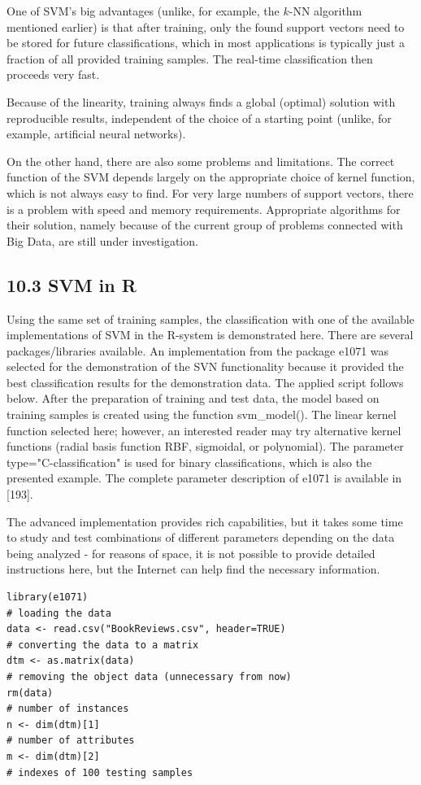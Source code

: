 \documentclass[10pt]{book}
\begin{document}
One of SVM's big advantages (unlike, for example, the $k$-NN algorithm mentioned earlier) is that after training, only the found support vectors need to be stored for future classifications, which in most applications is typically just a fraction of all provided training samples. The real-time classification then proceeds very fast.

Because of the linearity, training always finds a global (optimal) solution with reproducible results, independent of the choice of a starting point (unlike, for example, artificial neural networks).

On the other hand, there are also some problems and limitations. The correct function of the SVM depends largely on the appropriate choice of kernel function, which is not always easy to find. For very large numbers of support vectors, there\\
is a problem with speed and memory requirements. Appropriate algorithms for their solution, namely because of the current group of problems connected with Big Data, are still under investigation.

\subsection*{10.3 SVM in R}
Using the same set of training samples, the classification with one of the available implementations of SVM in the R-system is demonstrated here. There are several packages/libraries available. An implementation from the package e1071 was selected for the demonstration of the SVN functionality because it provided the best classification results for the demonstration data. The applied script follows below. After the preparation of training and test data, the model based on training samples is created using the function svm\_model(). The linear kernel function selected here; however, an interested reader may try alternative kernel functions (radial basis function RBF, sigmoidal, or polynomial). The parameter type="C-classification" is used for binary classifications, which is also the presented example. The complete parameter description of e1071 is available in [193].

The advanced implementation provides rich capabilities, but it takes some time to study and test combinations of different parameters depending on the data being analyzed - for reasons of space, it is not possible to provide detailed instructions here, but the Internet can help find the necessary information.

\begin{verbatim}
library(e1071)
# loading the data
data <- read.csv("BookReviews.csv", header=TRUE)
# converting the data to a matrix
dtm <- as.matrix(data)
# removing the object data (unnecessary from now)
rm(data)
# number of instances
n <- dim(dtm)[1]
# number of attributes
m <- dim(dtm)[2]
# indexes of 100 testing samples
\end{verbatim}
\end{document}
